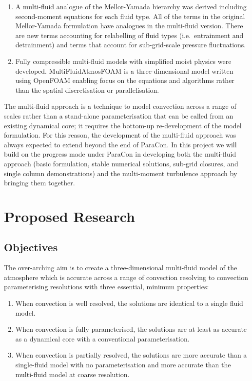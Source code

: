 \documentclass[11pt,a4paper]{article}
\begin{document}
\begin{enumerate}
\item A multi-fluid analogue of the Mellor-Yamada hierarchy was derived including second-moment equations for each fluid type. All of the terms in the original Mellor-Yamada formulation have analogues in the multi-fluid version. There are new terms accounting for relabelling of fluid types (i.e.\ entrainment and detrainment) and  terms that account for sub-grid-scale pressure fluctuations.

\item Fully compressible multi-fluid models with simplified moist physics were developed. MultiFluidAtmosFOAM is a three-dimensional model written using OpenFOAM enabling focus on the equations and algorithms rather than the spatial discretisation or parallelisation.

\end{enumerate}

The multi-fluid approach is a technique to model convection across a range of scales rather than a stand-alone parameterisation that can be called from an existing dynamical core; it requires the bottom-up re-development of the model formulation. For this reason, the development of the multi-fluid approach was always expected to extend beyond the end of ParaCon. In this project we will build on the progress made under ParaCon in developing both the multi-fluid approach (basic formulation, stable numerical solutions, sub-grid closures, and single column demonstrations) and the multi-moment turbulence approach by bringing them together.

\section{Proposed Research}

\subsection{Objectives}

The over-arching aim is to create a three-dimensional multi-fluid model of the atmosphere which is accurate across a range of convection resolving to convection parameterising resolutions with three essential, minimum properties:

\begin{enumerate}\renewcommand{\theenumi}{\alph{enumi}}
\item When convection is well resolved, the solutions are identical to a single fluid model.
\item When convection is fully parameterised, the solutions are at least as accurate as a dynamical core with a conventional parameterisation.
\item When convection is partially resolved, the solutions are more accurate than a single-fluid model with no parameterisation and more accurate than the multi-fluid model at coarse resolution.
\end{enumerate}
\end{document}
